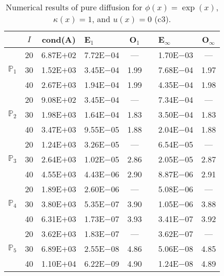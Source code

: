 \begin{table}[H]
\centering
\caption{Numerical results of pure diffusion for $\phi(x)=\exp(x)$, $\kappa(x)=1$, and $u(x)=0$ (c3).}
\begin{tabular}{@{}l c c l c c l c@{}}
\toprule
 & $I$ & cond(A) & E$_1$ & O$_1$ && E$_{\infty}$ & O$_{\infty}$\\
\midrule
\multirow{3}{*}{$\mathbb{P}_{1}$}
 & 20 & 6.87E$+$02 & 7.72E$-$04 & --- && 1.70E$-$03 & ---\\
 & 30 & 1.52E$+$03 & 3.45E$-$04 & 1.99 && 7.68E$-$04 & 1.97\\
 & 40 & 2.67E$+$03 & 1.94E$-$04 & 1.99 && 4.35E$-$04 & 1.98\\
\midrule
\multirow{3}{*}{$\mathbb{P}_{2}$}
 & 20 & 9.08E$+$02 & 3.45E$-$04 & --- && 7.34E$-$04 & ---\\
 & 30 & 1.98E$+$03 & 1.64E$-$04 & 1.83 && 3.50E$-$04 & 1.83\\
 & 40 & 3.47E$+$03 & 9.55E$-$05 & 1.88 && 2.04E$-$04 & 1.88\\
\midrule
\multirow{3}{*}{$\mathbb{P}_{3}$}
 & 20 & 1.24E$+$03 & 3.26E$-$05 & --- && 6.54E$-$05 & ---\\
 & 30 & 2.64E$+$03 & 1.02E$-$05 & 2.86 && 2.05E$-$05 & 2.87\\
 & 40 & 4.55E$+$03 & 4.43E$-$06 & 2.90 && 8.87E$-$06 & 2.91\\
\midrule
\multirow{3}{*}{$\mathbb{P}_{4}$}
 & 20 & 1.89E$+$03 & 2.60E$-$06 & --- && 5.08E$-$06 & ---\\
 & 30 & 3.80E$+$03 & 5.35E$-$07 & 3.90 && 1.05E$-$06 & 3.88\\
 & 40 & 6.31E$+$03 & 1.73E$-$07 & 3.93 && 3.41E$-$07 & 3.92\\
\midrule
\multirow{3}{*}{$\mathbb{P}_{5}$}
 & 20 & 3.62E$+$03 & 1.83E$-$07 & --- && 3.62E$-$07 & ---\\
 & 30 & 6.89E$+$03 & 2.55E$-$08 & 4.86 && 5.06E$-$08 & 4.85\\
 & 40 & 1.10E$+$04 & 6.22E$-$09 & 4.90 && 1.24E$-$08 & 4.89\\
\bottomrule
\end{tabular}
\end{table}